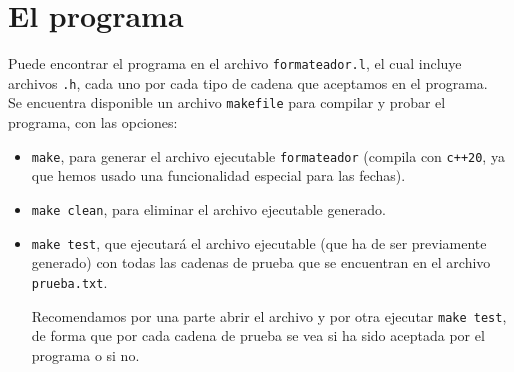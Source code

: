 \documentclass[12pt]{article}
\begin{document}
    \section{El programa}
    Puede encontrar el programa en el archivo \verb|formateador.l|, el cual incluye archivos \verb|.h|, cada uno por cada tipo de cadena que aceptamos en el programa.\\

    Se encuentra disponible un archivo \verb|makefile| para compilar y probar el programa, con las opciones:
    \begin{itemize}
        \item \verb|make|, para generar el archivo ejecutable \verb|formateador| (compila con \verb|c++20|, ya que hemos usado una funcionalidad especial para las fechas).
        \item \verb|make clean|, para eliminar el archivo ejecutable generado.
        \item \verb|make test|, que ejecutará el archivo ejecutable (que ha de ser previamente generado) con todas las cadenas de prueba que se encuentran en el archivo \verb|prueba.txt|.

            Recomendamos por una parte abrir el archivo y por otra ejecutar \verb|make test|, de forma que por cada cadena de prueba se vea si ha sido aceptada por el programa o si no.
    \end{itemize}

    
\end{document}

